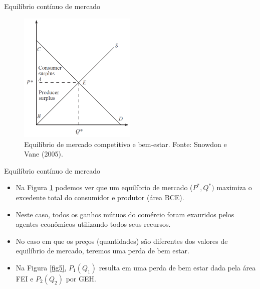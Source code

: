 \documentclass[10pt]{beamer}
\begin{document}
\begin{frame}{Equilíbrio contínuo de mercado}
    \begin{figure}
        \centering
        \includegraphics[width=0.5\textwidth]{./figures/aula11_fig7.PNG}
        \caption{Equilíbrio de mercado competitivo e bem-estar. Fonte: Snowdon e Vane (2005).}
        \label{fig4}
    \end{figure}
\end{frame}

\begin{frame}{Equilíbrio contínuo de mercado}
    \begin{itemize}
        \item Na Figura \ref{fig4} podemos ver que um equilíbrio de mercado ($P^*,Q^*)$ maximiza o excedente total do consumidor e produtor (área BCE).
        \bigskip
        \item Neste caso, todos os ganhos mútuos do comércio foram exauridos pelos agentes econômicos utilizando todos seus recursos.
        \bigskip
        \item No caso em que os preços (quantidades) são diferentes dos valores de equilíbrio de mercado, teremos uma perda de bem estar.
        \bigskip
        \item Na Figura \ref{fig5}, $P_1(Q_1)$ resulta em uma perda de bem estar dada pela área FEI e $P_2(Q_2)$ por GEH.
    \end{itemize}
\end{frame}
\end{document}
